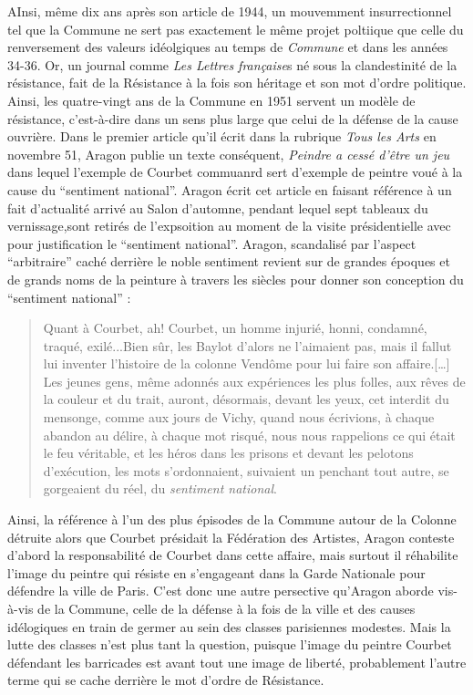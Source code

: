 AInsi, même dix ans après son article de 1944, un mouvemment insurrectionnel tel que la Commune ne sert pas exactement le même projet poltiique que celle du renversement des valeurs idéolgiques au temps de \emph{Commune} et  dans les années 34-36. Or, un journal comme \emph{Les Lettres française}s né sous la clandestinité de la résistance, fait de la Résistance à la fois son héritage et son mot d'ordre politique. Ainsi, les quatre-vingt ans de la Commune en 1951 servent un modèle de résistance, c'est-à-dire dans un sens plus large que celui de la défense de la cause ouvrière. Dans le premier article qu'il écrit dans la rubrique \emph{Tous les Arts} en novembre 51, Aragon publie un texte conséquent, \emph{Peindre a cessé d'être un jeu} dans lequel l'exemple de Courbet commuanrd sert d'exemple de peintre voué à la cause du \enquote{sentiment national}. Aragon écrit cet article en faisant référence à un fait d'actualité arrivé au Salon d'automne, pendant lequel sept tableaux du vernissage,sont retirés de l'expsoition au moment de la visite présidentielle avec pour justification le \enquote{sentiment national}. Aragon, scandalisé par l'aspect \enquote{arbitraire} caché derrière le noble sentiment revient sur de grandes époques et de grands noms de la peinture à travers les siècles pour donner son conception du \enquote{sentiment national} : 
 
\begin{quote}
Quant à Courbet, ah! Courbet, un homme injurié, honni, condamné, traqué, exilé...Bien sûr, les Baylot d'alors ne l'aimaient pas, mais il fallut lui inventer l'histoire de la colonne Vendôme pour lui faire son affaire.[…] Les jeunes gens, même adonnés aux expériences les plus folles, aux rêves de la couleur et du trait, auront, désormais, devant les yeux, cet interdit du mensonge, comme aux jours de Vichy, quand nous écrivions, à chaque abandon au délire, à chaque mot risqué, nous nous rappelions ce qui était le feu véritable, et les héros dans les prisons et devant les pelotons d'exécution, les mots s'ordonnaient, suivaient un penchant tout autre, se gorgeaient du réel, du \emph{sentiment national}. 	
\end{quote}

Ainsi, la référence à l'un des plus épisodes de la Commune autour de la Colonne détruite alors que Courbet présidait la Fédération des Artistes, Aragon conteste d'abord la responsabilité de Courbet dans cette affaire, mais surtout il réhabilite l'image du peintre qui résiste en s'engageant dans la Garde Nationale pour défendre la ville de Paris. C'est donc une autre persective qu'Aragon aborde vis-à-vis de la Commune, celle de la défense à la fois de la ville et des causes idélogiques en train de germer au sein des classes parisiennes modestes. Mais la lutte des classes n'est plus tant la question, puisque l'image du peintre Courbet défendant les barricades est avant tout une image de liberté, probablement l'autre terme qui se cache derrière le mot d'ordre de Résistance. 

